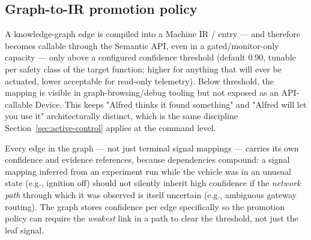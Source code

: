 \subsection{Graph-to-IR promotion policy}

\begin{decision}[title={Promotion threshold}]
A knowledge-graph edge is compiled into a Machine IR / entry --- and therefore becomes callable through the Semantic API, even in a gated/monitor-only capacity --- only above a configured confidence threshold (default 0.90, tunable per safety class of the target function; higher for anything that will ever be actuated, lower acceptable for read-only telemetry). Below threshold, the mapping is visible in graph-browsing/debug tooling but not exposed as an API-callable Device. This keeps "Alfred thinks it found something" and "Alfred will let you use it" architecturally distinct, which is the same discipline Section~\ref{sec:active-control} applies at the command level.
\end{decision}

Every edge in the graph --- not just terminal signal mappings --- carries its own confidence and evidence references, because dependencies compound: a signal mapping inferred from an experiment run while the vehicle was in an unusual state (e.g., ignition off) should not silently inherit high confidence if the \emph{network path} through which it was observed is itself uncertain (e.g., ambiguous gateway routing). The graph stores confidence per edge specifically so the promotion policy can require the \emph{weakest} link in a path to clear the threshold, not just the leaf signal.
